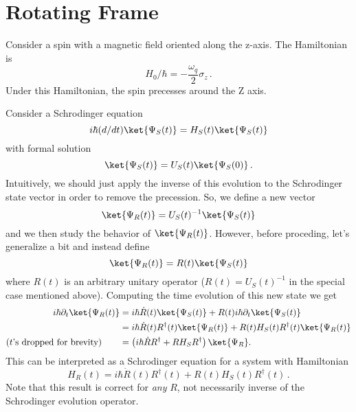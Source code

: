 \section{Rotating Frame}

Consider a spin with a magnetic field oriented along the z-axis.
The Hamiltonian is
\begin{equation}
  H_0/\hbar = -\frac{\omega_q}{2}\sigma_z
  \, .
\end{equation}
Under this Hamiltonian, the spin precesses around the Z axis.

Consider a Schrodinger equation
\begin{equation}
  i \hbar (d/dt) \ket{\Psi_S(t)} = H_S(t) \ket{\Psi_S(t)}
\end{equation}
with formal solution
\begin{equation}
  \ket{\Psi_S(t)} = U_S(t) \ket{\Psi_S(0)} \, .
\end{equation}
Intuitively, we should just apply the inverse of this evolution to the Schrodinger state vector in order to remove the precession.
So, we define a new vector
\begin{equation}
  \ket{\Psi_R(t)} = U_S(t)^{-1} \ket{\Psi_S(t)}
\end{equation}
and we then study the behavior of $\ket{\Psi_R(t)}$.
However, before proceding, let's generalize a bit and instead define
\begin{equation}
  \ket{\Psi_R(t)} = R(t) \ket{\Psi_S(t)}
\end{equation}
where $R(t)$ is an arbitrary unitary operator ($R(t) = U_S(t)^{-1}$ in the special case mentioned above).
Computing the time evolution of this new state we get
\begin{align}
  i\hbar\partial_t \ket{\Psi_R(t)} &= i\hbar \dot{R}(t) \ket{\Psi_S(t)} + R(t) i \hbar\partial_t\ket{\Psi_S(t)} \nonumber \\
  &= i\hbar \dot{R}(t)R^{\dagger}(t) \ket{\Psi_R(t)} + R(t) H_S(t) R^{\dagger}(t) \ket{\Psi_R(t)} \nonumber \\
  \text{($t$'s dropped for brevity)} \qquad
  &= \left( i\hbar \dot{R}R^{\dagger} + R H_S R^{\dagger} \right) \ket{\Psi_R}.
\end{align}
This can be interpreted as a Schrodinger equation for a system with Hamiltonian
\begin{equation}
  H_R(t) = i\hbar \dot{R}(t)R^{\dagger}(t) + R(t) H_S(t) R^{\dagger}(t) \, .
\end{equation}
Note that this result is correct for \emph{any} $R$, not necessarily inverse of the Schrodinger evolution operator.
